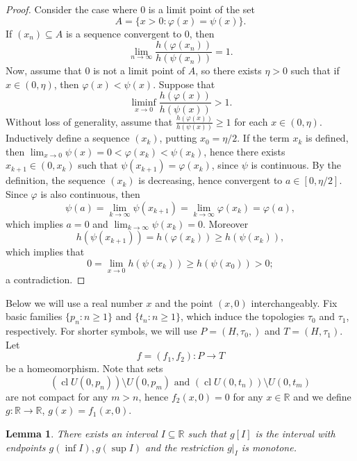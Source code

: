 \documentclass[a4paper,12pt,leqno]{amsart}
\newcommand{\bbR}{\mathbb{R}}
\newcommand{\cl}{\operatorname{cl}}
\renewcommand{\phi}{\varphi}
\newtheorem{lem}[thm]{Lemma}
\theoremstyle{definition}
\renewcommand{\geq}{\geqslant}
\begin{document}
\begin{proof}
  Consider the case where  $0$ is a limit point of the set
  $$A=\{x>0\colon \phi(x)=\psi(x)\}.$$
If $(x_n)\subseteq A$ is a sequence convergent to $0$, then
  $$\lim_{n\to\infty}\frac{h(\phi(x_n))}{h(\psi(x_n))}=1.$$
Now, assume that $0$ is not a limit point of  $A$, so there exists  $\eta>0$ such that if $x\in(0,\eta)$, then $\phi(x)<\psi(x)$.
  Suppose that
  $$\liminf_{x\to 0}\frac{h(\phi(x))}{h(\psi(x))}>1.$$
Without loss of generality,  assume that  $\frac{h(\phi(x))}{h(\psi(x))}\geq 1$ for each $x\in(0,\eta)$.
Inductively  define a sequence $(x_k)$, putting  $x_0=\eta/2$.
  If the term $x_k$ is defined, then   $\lim_{x\to0}\psi(x)=0<\phi(x_k)<\psi(x_k)$, hence there exists  $x_{k+1}\in(0,x_k)$ such that $\psi(x_{k+1})=\phi(x_k)$, since $\psi$ is continuous.
By the definition, the sequence $(x_k)$ is decreasing, hence convergent to   $a\in[0,\eta/2]$.
 Since $\phi$ is also continuous, then 
  $$\psi(a)=\lim_{k\to\infty}\psi(x_{k+1})=\lim_{k\to\infty}\phi(x_k)=\phi(a),$$
which implies $a=0$ and $\lim_{k\to\infty}\psi(x_k)=0$.
  Moreover
  $$h(\psi(x_{k+1}))=h(\phi(x_k))\geq h(\psi(x_k)),$$
  which implies that
  $$0=\lim_{x\to 0}h(\psi(x_k))\geq h(\psi(x_0))>0;$$
  a contradiction.
\end{proof}

Below we will use a real number $x$ and the point $(x,0)$ interchangeably.
Fix basic families $\{p_n\colon n\geq 1\}$ and $\{t_n\colon n\geq 1\}$, which induce the topologies $\tau_0$ and $\tau_1$, respectively.
For shorter symbols, we will use $P=(H,\tau_0,)$ and $T=(H,\tau_1)$.
Let
$$f=(f_1,f_2)\colon P\to T$$
 be a homeomorphism.
 Note that sets
 $$(\cl U(0,p_n))\setminus U(0,p_m)\mbox{ and }(\cl U(0,t_n))\setminus U(0,t_m)$$
 are not compact for any $m>n$, hence $f_2(x,0)=0$ for any $x\in\bbR$ and we define $g\colon\bbR\to\bbR$, $g(x)=f_1(x,0)$.

\begin{lem}
  There exists an interval $I\subseteq\bbR$ such that $g[I]$ is the interval with endpoints $g(\inf I),g(\sup I)$ and the restriction $g|_{I}$ is monotone.
\end{lem}
\end{document}
